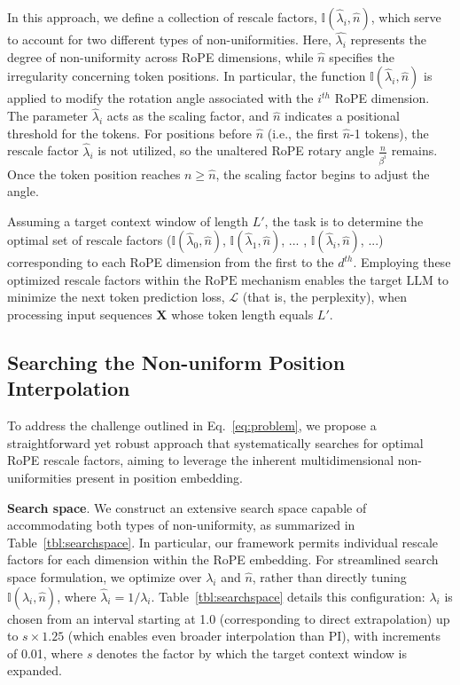 In this approach, we define a collection of rescale factors, $\mathbb{I}(\hat{\lambda}_{i},\hat{n})$, which serve to account for two different types of non-uniformities. Here, $\hat{\lambda_i}$ represents the degree of non-uniformity across RoPE dimensions, while $\hat{n}$ specifies the irregularity concerning token positions. In particular, the function $\mathbb{I}(\hat{\lambda}_{i},\hat{n})$ is applied to modify the rotation angle associated with the $i^{th}$ RoPE dimension. The parameter $\hat\lambda_{i}$ acts as the scaling factor, and $\hat{n}$ indicates a positional threshold for the tokens. For positions before $\hat{n}$ (i.e., the first $\hat{n}$-1 tokens), the rescale factor $\hat\lambda_{i}$ is not utilized, so the unaltered RoPE rotary angle $\frac{n}{\beta^i}$ remains. Once the token position reaches $n\ge\hat{n}$, the scaling factor begins to adjust the angle.

Assuming a target context window of length $L'$, the task is to determine the optimal set of rescale factors ($\mathbb{I}(\hat{\lambda}_{0},\hat{n})$, $\mathbb{I}(\hat{\lambda}_{1},\hat{n})$, ... , $\mathbb{I}(\hat{\lambda}_{i},\hat{n})$, ...) corresponding to each RoPE dimension from the first to the $d^{th}$. Employing these optimized rescale factors within the $\text{RoPE}$ mechanism enables the target $\text{LLM}$ to minimize the next token prediction loss, $\mathcal{L}$ (that is, the perplexity), when processing input sequences $\mathbf{X}$ whose token length equals $L'$.

\subsection{Searching the Non-uniform Position Interpolation}

To address the challenge outlined in Eq.~\ref{eq:problem}, we propose a straightforward yet robust approach that systematically searches for optimal RoPE rescale factors, aiming to leverage the inherent multidimensional non-uniformities present in position embedding.

\textbf{Search space}. We construct an extensive search space capable of accommodating both types of non-uniformity, as summarized in Table~\ref{tbl:searchspace}. In particular, our framework permits individual rescale factors for each dimension within the RoPE embedding. For streamlined search space formulation, we optimize over $\lambda_i$ and $\hat{n}$, rather than directly tuning $\mathbb{I}(\hat{\lambda}_{i},\hat{n})$, where $\hat{\lambda}_{i}=1/\lambda_i$. 
Table~\ref{tbl:searchspace} details this configuration: $\lambda_i$ is chosen from an interval starting at 1.0 (corresponding to direct extrapolation) up to $s\times1.25$ (which enables even broader interpolation than PI), with increments of 0.01, where $s$ denotes the factor by which the target context window is expanded.

